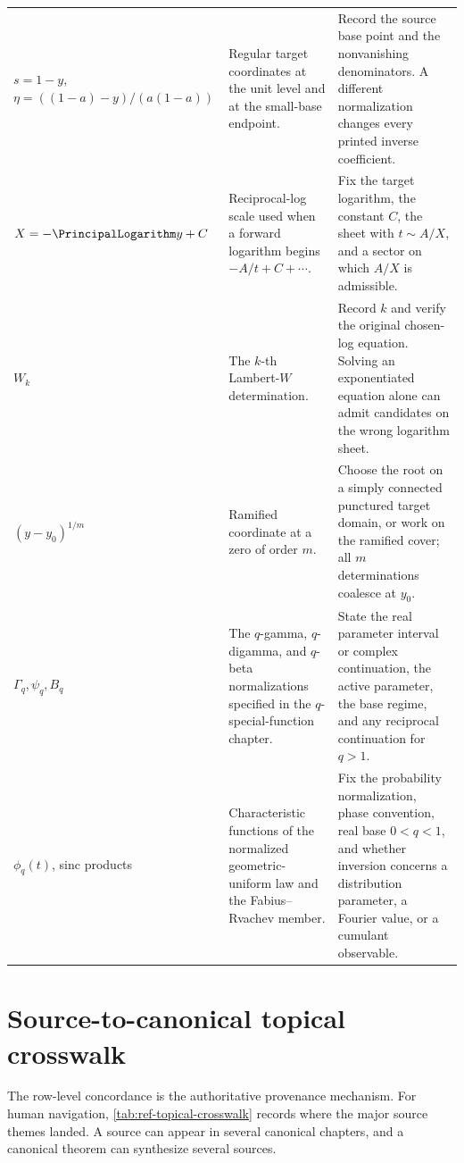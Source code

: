 \begin{longtable}{@{}>{\raggedright\arraybackslash}p{}>{\raggedright\arraybackslash}p{}>{\raggedright\arraybackslash}p{}@{}}
\addlinespace
\(s=1-y\), \(\eta=((1-a)-y)/(a(1-a))\)
& Regular target coordinates at the unit level and at the small-base endpoint.
& Record the source base point and the nonvanishing denominators.  A different
  normalization changes every printed inverse coefficient.\\
\addlinespace
\(X=-\PrincipalLogarithm y+C\)
& Reciprocal-log scale used when a forward logarithm begins
  \(-A/t+C+\cdots\).
& Fix the target logarithm, the constant \(C\), the sheet with \(t\sim A/X\),
  and a sector on which \(A/X\) is admissible.\\
\addlinespace
\(W_k\)
& The \(k\)-th Lambert-\(W\) determination.
& Record \(k\) and verify the original chosen-log equation.  Solving an
  exponentiated equation alone can admit candidates on the wrong logarithm
  sheet.\\
\addlinespace
\((y-y_0)^{1/m}\)
& Ramified coordinate at a zero of order \(m\).
& Choose the root on a simply connected punctured target domain, or work on
  the ramified cover; all \(m\) determinations coalesce at \(y_0\).\\
\addlinespace
\(\Gamma_q,\psi_q,B_q\)
& The \(q\)-gamma, \(q\)-digamma, and \(q\)-beta normalizations specified in
  the \(q\)-special-function chapter.
& State the real parameter interval or complex continuation, the active
  parameter, the base regime, and any reciprocal continuation for \(q>1\).\\
\addlinespace
\(\phi_q(t)\), sinc products
& Characteristic functions of the normalized geometric-uniform law and the
  Fabius--Rvachev member.
& Fix the probability normalization, phase convention, real base
  \(0<q<1\), and whether inversion concerns a distribution parameter, a
  Fourier value, or a cumulant observable.\\
\end{longtable}
\endgroup

\section{Source-to-canonical topical crosswalk}
\label{sec:ref-topical-crosswalk}

The row-level concordance is the authoritative provenance mechanism.  For
human navigation, \cref{tab:ref-topical-crosswalk} records where the major
source themes landed.  A source can appear in several canonical chapters, and
a canonical theorem can synthesize several sources.

